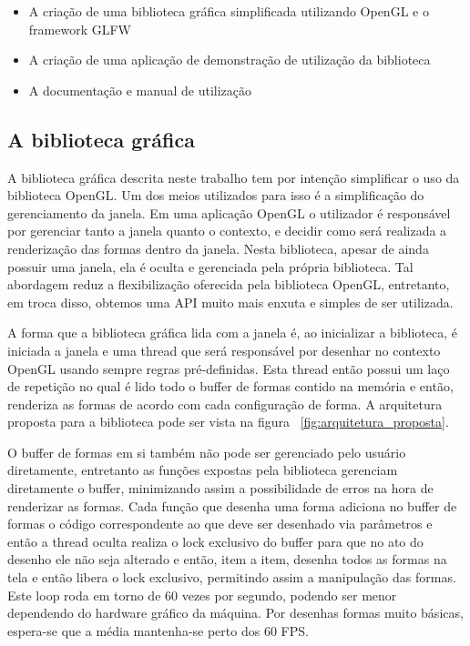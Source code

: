 \documentclass[12pt, %
openright,
oneside, %
a4paper,    %
brazil]{facom-ufu-abntex2}
\begin{document}
\begin{itemize}
    \item A criação de uma biblioteca gráfica simplificada utilizando OpenGL e o framework GLFW
    \item A criação de uma aplicação de demonstração de utilização da biblioteca
    \item A documentação e manual de utilização
\end{itemize}

\subsection{A biblioteca gráfica}
A biblioteca gráfica descrita neste trabalho tem por intenção simplificar o uso da biblioteca OpenGL. Um dos meios utilizados para isso é a simplificação do gerenciamento da janela. Em uma aplicação OpenGL o utilizador é responsável por gerenciar tanto a janela quanto o contexto, e decidir como será realizada a renderização das formas dentro da janela. Nesta biblioteca, apesar de ainda possuir uma janela, ela é oculta e gerenciada pela própria biblioteca. Tal abordagem reduz a flexibilização oferecida pela biblioteca OpenGL, entretanto, em troca disso, obtemos uma API muito mais enxuta e simples de ser utilizada.

A forma que a biblioteca gráfica lida com a janela é, ao inicializar a biblioteca, é iniciada a janela e uma thread que será responsável por desenhar no contexto OpenGL usando sempre regras pré-definidas. Esta thread então possui um laço de repetição no qual é lido todo o buffer de formas contido na memória e então, renderiza as formas de acordo com cada configuração de forma. A arquitetura proposta para a biblioteca pode ser vista na figura ~\ref{fig:arquitetura_proposta}.

O buffer de formas em si também não pode ser gerenciado pelo usuário diretamente, entretanto as funções expostas pela biblioteca gerenciam diretamente o buffer, minimizando assim a possibilidade de erros na hora de renderizar as formas. Cada função que desenha uma forma adiciona no buffer de formas o código correspondente ao que deve ser desenhado via parâmetros e então a thread oculta realiza o lock exclusivo do buffer para que no ato do desenho ele não seja alterado e então, item a item, desenha todos as formas na tela e então libera o lock exclusivo, permitindo assim a manipulação das formas. Este loop roda em torno de 60 vezes por segundo, podendo ser menor dependendo do hardware gráfico da máquina. Por desenhas formas muito básicas, espera-se que a média mantenha-se perto dos 60 FPS.
\end{document}
